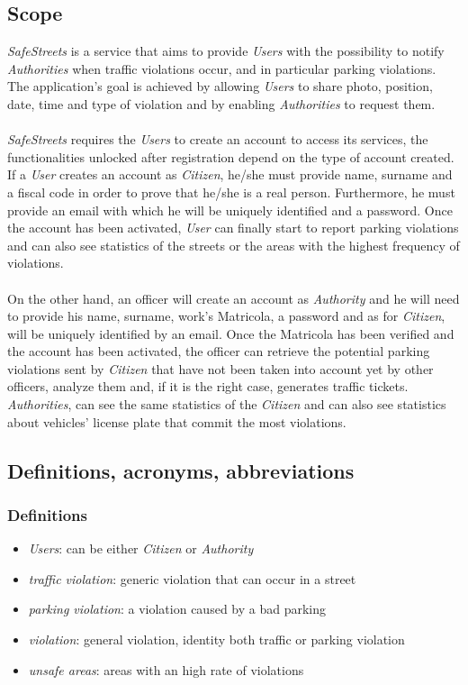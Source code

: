 \documentclass{article}
\begin{document}
\subsection{Scope}
\textit{SafeStreets} is a service that aims to provide \textit{Users} with the possibility to notify \textit{Authorities} when traffic 
violations occur, and in particular parking violations. The application's goal is achieved by allowing \textit{Users} 
to share photo, position, date, time and type of violation and by enabling \textit{Authorities} to request them.
\\
\\
\textit{SafeStreets} requires the \textit{Users} to create an account to access its services, the functionalities unlocked after 
registration depend on the type of account created.
\\
If a \textit{User} creates an account as \textit{Citizen}, he/she must provide name, surname and a fiscal code in order to prove 
that he/she is a real person. Furthermore, he must provide an email with which he will be uniquely identified 
and a password. Once the account has been activated, \textit{User} can finally start to report parking violations and can also see 
statistics of the streets or the areas with the highest frequency of violations.
\\
\\
On the other hand, an officer will create an account as \textit{Authority} and he will need to provide his name, surname, 
work's Matricola, a password and as for \textit{Citizen}, will be uniquely identified by an email. Once the Matricola 
has been verified and the account has been activated, the officer can retrieve the potential parking violations 
sent by \textit{Citizen} that have not been taken into account yet by other officers, analyze them and, if it is the 
right case, generates traffic tickets. \textit{Authorities}, can see the same statistics of the \textit{Citizen} and can also see
statistics about vehicles' license plate that commit the most violations.


\subsection{Definitions, acronyms, abbreviations}

\subsubsection{Definitions}
\begin{itemize}
    \item \textit{Users}: can be either \textit{Citizen} or \textit{Authority}
    \item \textit{traffic violation}: generic violation that can occur in a street
    \item \textit{parking violation}: a violation caused by a bad parking
    \item \textit{violation}: general violation, identity both traffic or parking violation
    \item \textit{unsafe areas}: areas with an high rate of violations
\end{itemize}
\end{document}

